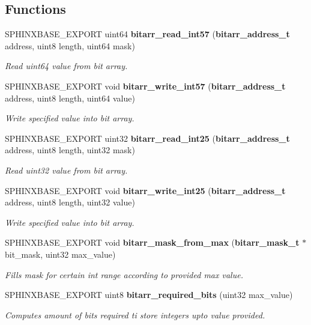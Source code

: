 \subsection*{Functions}
\begin{DoxyCompactItemize}
\item 
S\-P\-H\-I\-N\-X\-B\-A\-S\-E\-\_\-\-E\-X\-P\-O\-R\-T uint64 {\bf bitarr\-\_\-read\-\_\-int57} ({\bf bitarr\-\_\-address\-\_\-t} address, uint8 length, uint64 mask)
\begin{DoxyCompactList}\small\item\em Read uint64 value from bit array. \end{DoxyCompactList}\item 
S\-P\-H\-I\-N\-X\-B\-A\-S\-E\-\_\-\-E\-X\-P\-O\-R\-T void {\bf bitarr\-\_\-write\-\_\-int57} ({\bf bitarr\-\_\-address\-\_\-t} address, uint8 length, uint64 value)
\begin{DoxyCompactList}\small\item\em Write specified value into bit array. \end{DoxyCompactList}\item 
S\-P\-H\-I\-N\-X\-B\-A\-S\-E\-\_\-\-E\-X\-P\-O\-R\-T uint32 {\bf bitarr\-\_\-read\-\_\-int25} ({\bf bitarr\-\_\-address\-\_\-t} address, uint8 length, uint32 mask)
\begin{DoxyCompactList}\small\item\em Read uint32 value from bit array. \end{DoxyCompactList}\item 
S\-P\-H\-I\-N\-X\-B\-A\-S\-E\-\_\-\-E\-X\-P\-O\-R\-T void {\bf bitarr\-\_\-write\-\_\-int25} ({\bf bitarr\-\_\-address\-\_\-t} address, uint8 length, uint32 value)
\begin{DoxyCompactList}\small\item\em Write specified value into bit array. \end{DoxyCompactList}\item 
S\-P\-H\-I\-N\-X\-B\-A\-S\-E\-\_\-\-E\-X\-P\-O\-R\-T void {\bf bitarr\-\_\-mask\-\_\-from\-\_\-max} ({\bf bitarr\-\_\-mask\-\_\-t} $\ast$bit\-\_\-mask, uint32 max\-\_\-value)
\begin{DoxyCompactList}\small\item\em Fills mask for certain int range according to provided max value. \end{DoxyCompactList}\item 
S\-P\-H\-I\-N\-X\-B\-A\-S\-E\-\_\-\-E\-X\-P\-O\-R\-T uint8 {\bf bitarr\-\_\-required\-\_\-bits} (uint32 max\-\_\-value)
\begin{DoxyCompactList}\small\item\em Computes amount of bits required ti store integers upto value provided. \end{DoxyCompactList}\end{DoxyCompactItemize}


